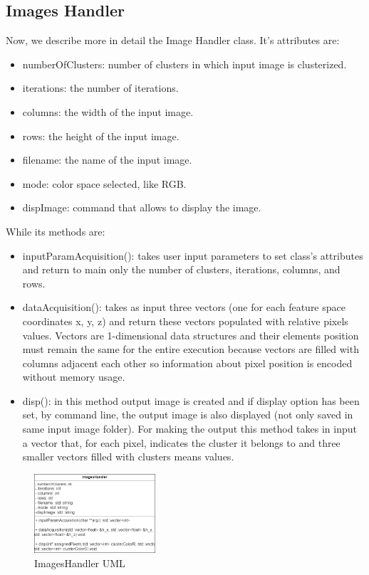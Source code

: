 \documentclass[10pt,twocolumn,letterpaper]{article}
\begin{document}
\subsection{Images Handler}

Now, we describe more in detail the Image Handler class. It’s attributes are:
\begin{itemize}
    \item numberOfClusters: number of clusters in which input image is clusterized.
    \item iterations: the number of iterations.
    \item columns: the width of the input image.
    \item rows: the height of the input image.
    \item filename: the name of the input image.
    \item mode: color space selected, like RGB.
    \item dispImage: command that allows to display the image.
\end{itemize}

While its methods are:
\begin{itemize}
    \item inputParamAcquisition(): takes user input parameters to set class’s attributes and return to main only the number of clusters, iterations, columns, and rows.
    \item dataAcquisition(): takes as input three vectors (one for each feature space coordinates x, y, z) and return these vectors populated with relative pixels values. Vectors are 1-dimensional data structures and their elements position must remain the same for the entire execution because vectors are filled with columns adjacent each other so information about pixel position is encoded without memory usage.
    \item disp(): in this method output image is created and if display option has been set, by command line, the output image is also displayed (not only saved in same input image folder). For making the output this method takes in input a vector that, for each pixel, indicates the cluster it belongs to and three smaller vectors filled with clusters means values.
\end{itemize}
\begin{figure}[H]
\begin{center}
\includegraphics[width=0.4\textwidth]{latex/IMageHANDLERuml.png}
\caption{ImagesHandler UML}
\label{etichetta}
\end{center}
\end{figure}
\end{document}
